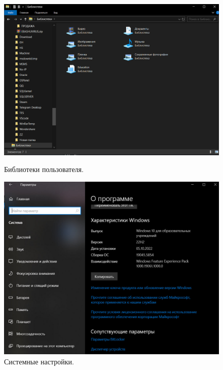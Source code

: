 \begin{figure}[h!]
    \centering
    \begin{minipage}[p]{0.45\linewidth}
            \centering
            \includegraphics[width=1\linewidth]{Pic/lab1/photo_2025-05-21_08-15-00.jpg}
            \caption{Библиотеки пользователя.}
            \label{fig:bibuser}
    \end{minipage}
    \hfill
    \begin{minipage}[p]{0.45\linewidth}
            \centering
            \includegraphics[width=0.9\linewidth]{Pic/lab1/photo_2025-05-21_08-14-59.jpg}
            \caption{Системные настройки.}
            \label{fig:winedu}
    \end{minipage}
    
\end{figure}


